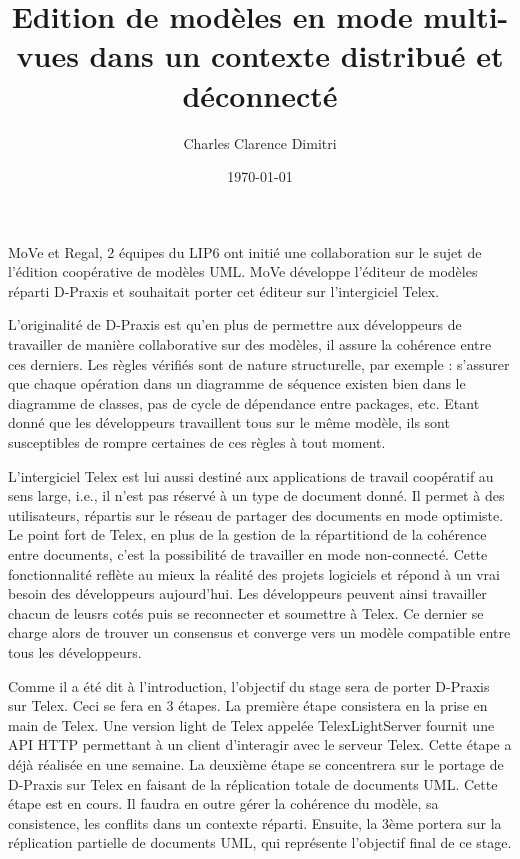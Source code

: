 \documentclass[a4paper,oneside,12pt]{article}
\title{Edition de modèles en mode multi-vues dans un contexte distribué et déconnecté}
\author{Charles Clarence Dimitri}
\date \today
\begin{document}
\maketitle

MoVe et Regal, 2 équipes du LIP6 ont initié une collaboration sur le sujet de l'édition coopérative de modèles UML. MoVe développe l'éditeur de modèles réparti D-Praxis et souhaitait porter cet éditeur sur l'intergiciel Telex.

L'originalité de D-Praxis est qu'en plus de permettre aux développeurs de travailler de manière collaborative sur des modèles, il assure la cohérence entre ces derniers. Les règles vérifiés sont de nature structurelle, par exemple : s'assurer que chaque opération dans un diagramme de séquence existen bien dans le diagramme de classes, pas de cycle de dépendance entre packages, etc. Etant donné que les développeurs travaillent tous sur le même modèle, ils sont susceptibles de rompre certaines de ces règles à tout moment.
 
L'intergiciel Telex est lui aussi destiné aux applications de travail coopératif au sens large, i.e., il n'est pas réservé à un type de document donné. Il permet à des utilisateurs, répartis sur le réseau de partager des documents en mode optimiste. Le point fort de Telex, en plus de la gestion de la répartitiond de la cohérence entre documents, c'est la possibilité de travailler en mode non-connecté. Cette fonctionnalité reflète au mieux la réalité des projets logiciels et répond à un vrai besoin des développeurs aujourd'hui. Les développeurs peuvent ainsi travailler chacun de leusrs cotés puis se reconnecter et soumettre à Telex. Ce dernier se charge alors de trouver un consensus et converge vers un modèle compatible entre tous les développeurs.

Comme il a été dit à l'introduction, l'objectif du stage sera de porter D-Praxis sur Telex. Ceci se fera en 3 étapes. La première étape consistera en la prise en main de Telex. Une version light de Telex appelée TelexLightServer fournit une API HTTP permettant à un client d'interagir avec le serveur Telex. Cette étape a déjà réalisée en une semaine. La deuxième étape se concentrera sur le portage de D-Praxis sur Telex en faisant de la réplication totale de documents UML. Cette étape est en cours. Il faudra en outre gérer la cohérence du modèle, sa consistence, les conflits dans un contexte réparti. Ensuite, la 3ème portera sur la réplication partielle de documents UML, qui représente l'objectif final de ce stage.

 
\end{document}
